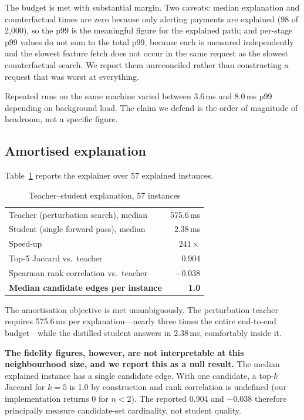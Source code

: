 \documentclass[conference]{IEEEtran}
\begin{document}
The budget is met with substantial margin. Two caveats: median explanation and
counterfactual times are zero because only alerting payments are explained (98
of 2{,}000), so the p99 is the meaningful figure for the explained path; and
per-stage p99 values do not sum to the total p99, because each is measured
independently and the slowest feature fetch does not occur in the same request
as the slowest counterfactual search. We report them unreconciled rather than
constructing a request that was worst at everything.

Repeated runs on the same machine varied between 3.6\,ms and 8.0\,ms p99
depending on background load. The claim we defend is the order of magnitude of
headroom, not a specific figure.

\subsection{Amortised explanation}
\label{sec:explainer}

Table~\ref{tab:explainer} reports the explainer over 57 explained instances.

\begin{table}[t]
\caption{Teacher--student explanation, 57 instances}
\label{tab:explainer}
\centering
\small
\begin{tabular}{lr}
\toprule
Teacher (perturbation search), median & 575.6\,ms \\
Student (single forward pass), median & 2.38\,ms \\
Speed-up & $241\times$ \\
Top-5 Jaccard vs.\ teacher & 0.904 \\
Spearman rank correlation vs.\ teacher & $-0.038$ \\
\textbf{Median candidate edges per instance} & \textbf{1.0} \\
\bottomrule
\end{tabular}
\end{table}

The amortisation objective is met unambiguously. The perturbation teacher
requires 575.6\,ms per explanation---nearly three times the entire end-to-end
budget---while the distilled student answers in 2.38\,ms, comfortably inside it.

\textbf{The fidelity figures, however, are not interpretable at this
neighbourhood size, and we report this as a null result.} The median explained
instance has a single candidate edge. With one candidate, a top-$k$ Jaccard for
$k=5$ is 1.0 by construction and rank correlation is undefined (our
implementation returns 0 for $n<2$). The reported 0.904 and $-0.038$ therefore
principally measure candidate-set cardinality, not student quality.
\end{document}
